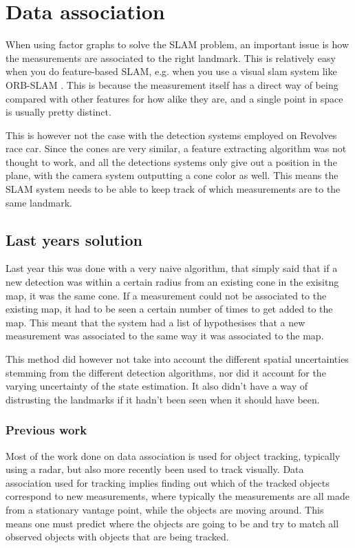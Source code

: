 \section{Data association}

When using factor graphs to solve the SLAM problem, an important issue is how the measurements are associated to the right landmark. This is relatively easy when you do feature-based SLAM, e.g. when you use a visual slam system like ORB-SLAM \cite{ORBSLAM}. This is because the measurement itself has a direct way of being compared with other features for how alike they are, and a single point in space is usually pretty distinct. 

This is however not the case with the detection systems employed on Revolves race car. Since the cones are very similar, a feature extracting algorithm was not thought to work, and all the detections systems only give out a position in the plane, with the camera system outputting a cone color as well. This means the SLAM system needs to be able to keep track of which measurements are to the same landmark. 

\subsection{Last years solution}

Last year this was done with a very naive algorithm, that simply said that if a new detection was within a certain radius from an existing cone in the exisitng map, it was the same cone. If a measurement could not be associated to the existing map, it had to be seen a certain number of times to get added to the map. This meant that the system had a list of hypothesises that a new measurement was associated to the same way it was associated to the map. 

This method did however not take into account the different spatial uncertainties stemming from the different detection algorithms, nor did it account for the varying uncertainty of the state estimation. It also didn't have a way of distrusting the landmarks if it hadn't been seen when it should have been. 

\subsubsection{Previous work} 

Most of the work done on data association is used for object tracking, typically using a radar\cite{RadarTracking}, but also more recently been used to track visually\cite{VisualTracking}. Data association used for tracking implies finding out which of the tracked objects correspond to new measurements, where typically the measurements are all made from a stationary vantage point, while the objects are moving around. This means one must predict where the objects are going to be and try to match all observed objects with objects that are being tracked. 

